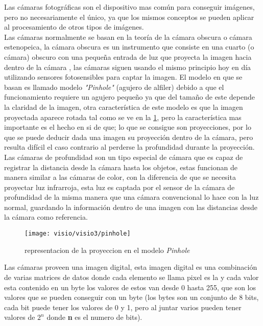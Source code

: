     
    Las cámaras fotográficas son el dispositivo mas común para conseguir imágenes, pero no necesariamente el único, ya que los mismos conceptos se pueden aplicar al procesamiento de otros tipos de imágenes.\\
    Las cámaras normalmente se basan en la teoría de la cámara obscura o cámara estenopeica, la cámara obscura es un instrumento que consiste en una cuarto (o cámara) obscuro con una pequeña entrada de luz que proyecta la imagen hacia dentro de la cámara , las cámaras siguen usando el mismo principio hoy en día utilizando sensores fotosensibles para captar la imagen. El modelo en que se basan es llamado modelo \textit{"Pinhole"} (agujero de alfiler) debido a que el funcionamiento requiere un agujero pequeño ya que del tamaño de este depende la claridad de la imagen, otra característica de este modelo es que la imagen proyectada aparece rotada tal como se ve en la \cref{fig:pinhole}, pero la característica mas importante es el hecho en si de que; lo que se consigue son proyecciones, por lo que se puede deducir dada una imagen su proyección dentro de la cámara, pero resulta difícil el caso contrario al perderse la profundidad durante la proyección. Las cámaras de profundidad son un tipo especial de cámara que es capaz de registrar la distancia desde la cámara hasta los objetos, estas funcionan de manera similar a las cámaras de color, con la diferencia de que se necesita proyectar luz  infrarroja, esta luz es captada por el sensor de la cámara de profundidad de la misma manera que una cámara convencional lo hace con la luz normal, guardando la información dentro de una imagen con las distancias desde la cámara como referencia.
    
    \begin{figure}[h]
    	\centering
    	\texttt{[image: visio/visio3/pinhole]}
    	\caption{representacion de la proyeccion en el modelo \textit{Pinhole}}
    	\label{fig:pinhole}
    \end{figure}
    
    Las cámaras proveen una imagen digital, esta imagen digital es una combinación de varias matrices de datos donde cada elemento se llama pixel es la y cada valor esta contenido en un byte los valores de estos van desde 0 hasta 255, que son los valores que se pueden conseguir con un byte (los bytes son un conjunto de 8 bits, cada bit puede tener los valores de 0 y 1, pero al juntar varios pueden tener valores de $2^n$ donde \textbf{n} es el numero de bits).
    
